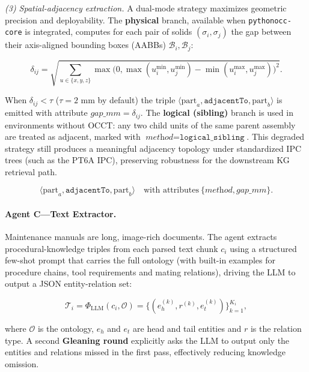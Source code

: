 \documentclass[applsci,article,submit,pdftex,moreauthors]{Definitions/mdpi}
\begin{document}
\textit{(3) Spatial-adjacency extraction.} A dual-mode strategy maximizes geometric precision and deployability. The \textbf{physical} branch, available when \texttt{pythonocc-core} is integrated, computes for each pair of solids $(\sigma_i,\sigma_j)$ the gap between their axis-aligned bounding boxes (AABBs) $\mathcal{B}_i, \mathcal{B}_j$:
\begin{linenomath}
\begin{equation}
\delta_{ij} = \sqrt{\sum_{u\in\{x,y,z\}}\max\!\bigl(0, \max(u_i^{\min}, u_j^{\min}) - \min(u_i^{\max}, u_j^{\max})\bigr)^{\!2}}.
\label{eq:gap}
\end{equation}
\end{linenomath}
When $\delta_{ij}<\tau$ ($\tau=2$ mm by default) the triple $\langle \text{part}_a, \texttt{adjacentTo}, \text{part}_b\rangle$ is emitted with attribute $\textit{gap\_mm}=\delta_{ij}$. The \textbf{logical (sibling)} branch is used in environments without OCCT: any two child units of the same parent assembly are treated as adjacent, marked with $\textit{method}=\texttt{logical\_sibling}$. This degraded strategy still produces a meaningful adjacency topology under standardized IPC trees (such as the PT6A IPC), preserving robustness for the downstream KG retrieval path.
\begin{linenomath}
\begin{equation}
\langle \text{part}_a, \texttt{adjacentTo}, \text{part}_b\rangle\quad\text{with attributes}\ \{\textit{method}, \textit{gap\_mm}\}.
\label{eq:adjacent}
\end{equation}
\end{linenomath}

\paragraph{Agent C---Text Extractor.} Maintenance manuals are long, image-rich documents. The agent extracts procedural-knowledge triples from each parsed text chunk $c_i$ using a structured few-shot prompt that carries the full ontology (with built-in examples for procedure chains, tool requirements and mating relations), driving the LLM to output a JSON entity-relation set:
\begin{linenomath}
\begin{equation}
\mathcal{T}_i = \Phi_{\text{LLM}}(c_i, \mathcal{O}) = \bigl\{(e_h^{(k)}, r^{(k)}, e_t^{(k)})\bigr\}_{k=1}^{K_i},
\label{eq:llm-extract}
\end{equation}
\end{linenomath}
where $\mathcal{O}$ is the ontology, $e_h$ and $e_t$ are head and tail entities and $r$ is the relation type. A second \textbf{Gleaning round} explicitly asks the LLM to output only the entities and relations missed in the first pass, effectively reducing knowledge omission.
\end{document}
